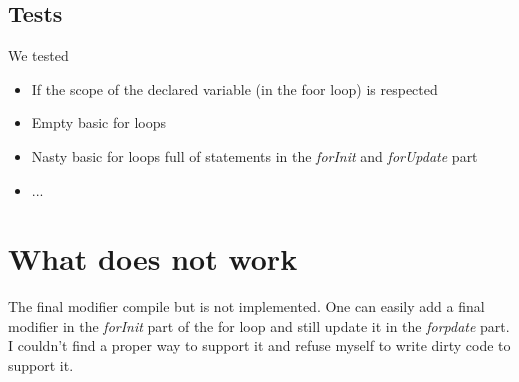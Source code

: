 \documentclass[10pt,a4paper]{article}
\begin{document}
\subsection{Tests}
We tested \begin{itemize}
\item{If the scope of the declared variable (in the foor loop) is respected}
\item{Empty basic for loops}
\item{Nasty basic for loops full of statements in the \textit{forInit} and \textit{forUpdate} part}
\item{...}
\end{itemize}
\section{What does not work}
The final modifier compile but is not implemented. One can easily add a final modifier in the \textit{forInit} part of the for loop and still update it in the \textit{forpdate} part. I couldn't find a proper way to support it and refuse myself to write dirty code to support it.  
\end{document}
